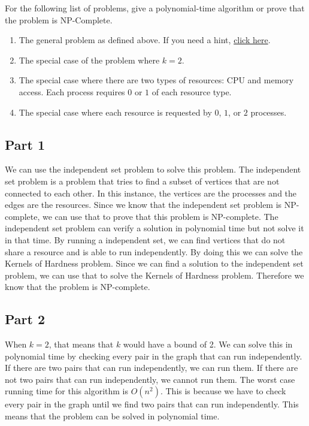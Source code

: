 \documentclass[12pt,letterpaper]{article}
\begin{document}
For the following list of problems, give a polynomial-time algorithm or prove that the problem is NP-Complete.

\begin{enumerate}
    \item The general problem as defined above. If you need a hint, \href{http://127.0.0.1/try_a_reduction_from_Independent_set}{click here}.
    \item The special case of the problem where $k=2$.
    \item The special case where there are two types of resources: CPU and memory access. Each process requires $0$ or $1$ of each resource type.
    \item The special case where each resource is requested by $0$, $1$, or $2$ processes.
\end{enumerate}

\subsection{Part 1}

We can use the independent set problem to solve this problem. The independent set problem is a problem that tries to find a subset of vertices that are not connected to each other. In this instance, the vertices are the processes and the edges are the resources. Since we know that the independent set problem is NP-complete, we can use that to prove that this problem is NP-complete. The independent set problem can verify a solution in polynomial time but not solve it in that time. By running a independent set, we can find vertices that do not share a resource and is able to run independently. By doing this we can solve the Kernels of Hardness problem. Since we can find a solution to the independent set problem, we can use that to solve the Kernels of Hardness problem. Therefore we know that the problem is NP-complete.

\subsection{Part 2}

When $k = 2$, that means that $k$ would have a bound of 2. We can solve this in polynomial time by checking every pair in the graph that can run independently. If there are two pairs that can run independently, we can run them. If there are not two pairs that can run independently, we cannot run them. 
The worst case running time for this algorithm is $O(n^2)$. This is because we have to check every pair in the graph until we find two pairs that can run independently. This means that the problem can be solved in polynomial time.
\end{document}
